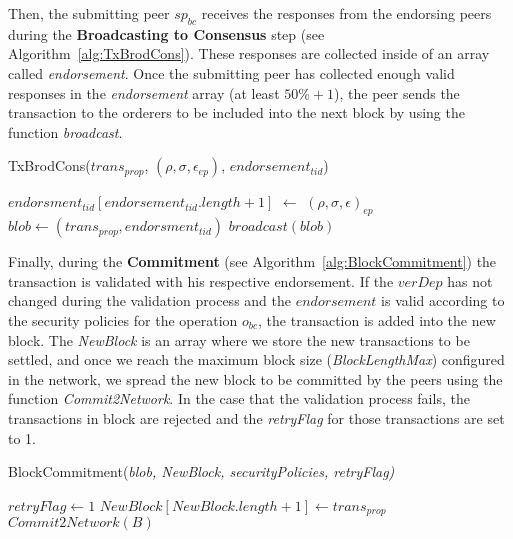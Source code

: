 \documentclass[conference]{llncs}
\begin{document}
Then, the submitting peer $sp_{bc}$ receives the responses from the endorsing peers during the \textbf{Broadcasting to Consensus} step (see Algorithm~\ref{alg:TxBrodCons}). These responses are collected inside of an array called \textit{endorsement}. Once the submitting peer has collected enough valid responses in the \textit{endorsement} array (at least $50\%+1$), the peer sends the transaction to the orderers to be included into the next block by using the function \textit{broadcast}. 

\begin{algorithm}[ht]
\caption{TxBrodCons($trans_{prop}$, $(\rho,\sigma,\epsilon_{ep})$, $endorsement_{tid}$)}
\label{alg:TxBrodCons}
\begin{algorithmic}[1]
\STATE $endorsment_{tid}[endorsement_{tid}.length+1]$ $\gets$ $(\rho,\sigma,\epsilon)_{ep}$
\STATE $blob \gets (trans_{prop},endorsment_{tid})$
\RETURN $broadcast(blob)$
\ENDIF
\end{algorithmic}
\end{algorithm}

Finally, during the \textbf{Commitment} (see Algorithm~\ref{alg:BlockCommitment}) the transaction is validated with his respective endorsement. If the $verDep$ has not changed during the validation process and the $endorsement$ is valid according to the security policies for the operation $o_{bc}$, the transaction is added into the new block. The \textit{NewBlock} is an array where we store the new transactions to be settled, and once we reach the maximum block size (\textit{BlockLengthMax}) configured in the network, we spread the new block to be committed by the peers using the function \textit{Commit2Network}. In the case that the validation process fails, the transactions in block are rejected and the \textit{retryFlag} for those transactions are set to 1. 

\begin{algorithm}[ht]
\caption{BlockCommitment(\emph{blob, NewBlock, securityPolicies, retryFlag)}}
\label{alg:BlockCommitment}
\begin{algorithmic}[1]
\RETURN $retryFlag \gets 1$
\ELSE \STATE $NewBlock [NewBlock.length + 1] \gets trans_{prop}$ \ENDIF
{}
\RETURN $Commit2Network(B)$ \ENDIF
\end{algorithmic}
\end{algorithm}
\end{document}
